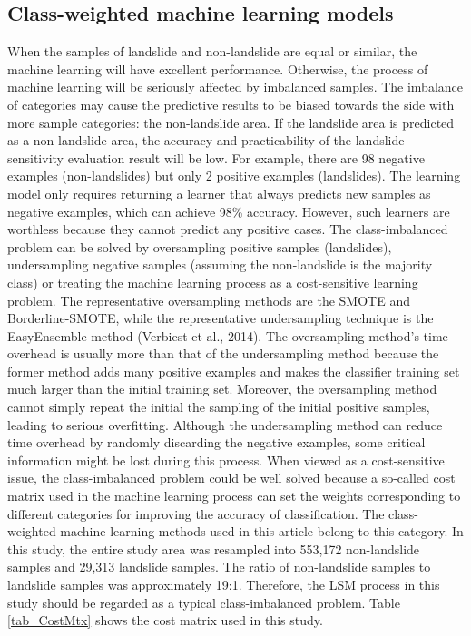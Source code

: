 \documentclass[a4paper,fleqn]{cas-sc}
\begin{document}
\subsection{Class-weighted machine learning models}

When the samples of landslide and non-landslide are equal or similar, the machine learning will have excellent performance. 
Otherwise, the process of machine learning will be seriously affected by imbalanced samples. 
The imbalance of categories may cause the predictive results to be biased towards the side with more sample categories: the non-landslide area. 
If the landslide area is predicted as a non-landslide area, the accuracy and practicability of the landslide sensitivity evaluation result will be low. 
For example, there are 98 negative examples (non-landslides) but only 2 positive examples (landslides). 
The learning model only requires returning a learner that always predicts new samples as negative examples, which can achieve 98\% accuracy. 
However, such learners are worthless because they cannot predict any positive cases.
The class-imbalanced problem can be solved by oversampling positive samples (landslides), undersampling negative samples (assuming the non-landslide is the majority class) or treating the machine learning process as a cost-sensitive learning problem. 
The representative oversampling methods are the SMOTE and Borderline-SMOTE, while the representative undersampling technique is the EasyEnsemble method (Verbiest et al., 2014). 
The oversampling method's time overhead is usually more than that of the undersampling method because the former method adds many positive examples and makes the classifier training set much larger than the initial training set. 
Moreover, the oversampling method cannot simply repeat the initial the sampling of the initial positive samples, leading to serious overfitting. 
Although the undersampling method can reduce time overhead by randomly discarding the negative examples, some critical information might be lost during this process. 
When viewed as a cost-sensitive issue, the class-imbalanced problem could be well solved because a so-called cost matrix used in the machine learning process can set the weights corresponding to different categories for improving the accuracy of classification. 
The class-weighted machine learning methods used in this article belong to this category.
In this study, the entire study area was resampled into 553,172 non-landslide samples and 29,313 landslide samples. 
The ratio of non-landslide samples to landslide samples was approximately 19:1. 
Therefore, the LSM process in this study should be regarded as a typical class-imbalanced problem. 
Table \ref{tab_CostMtx} shows the cost matrix used in this study.
\end{document}
